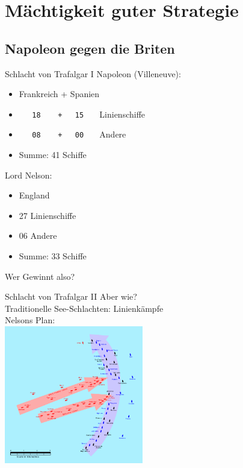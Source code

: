 \documentclass[12pt,compress,ngerman,utf8,t]{beamer}
\begin{document}
\section{Mächtigkeit guter Strategie}

\subsection{Napoleon gegen die Briten}

\begin{frame}[c, fragile]{Schlacht von Trafalgar I}
    Napoleon (Villeneuve):
    \begin{itemize}
        \item Frankreich + Spanien
        \item<2-> \verb!   18    +   15   ! Linienschiffe
        \item<2-> \verb!   08    +   00   ! Andere
        \item<3-> Summe: 41 Schiffe
    \end{itemize}

    Lord Nelson:
    \begin{itemize}
        \item England
        \item<2-> 27 Linienschiffe
        \item<2-> 06 Andere
        \item<3-> Summe: 33 Schiffe
    \end{itemize}
    \pause
    \pause
    \pause

    Wer Gewinnt also?
\end{frame}

\begin{frame}{Schlacht von Trafalgar II}
    Aber wie? \\
    \pause
    Traditionelle See-Schlachten: Linienkämpfe \\
    \pause
    Nelsons Plan: \\
    \includegraphics[height=6cm]{strategy/Trafalgar-1200hr.jpg}
\end{frame}
\end{document}
